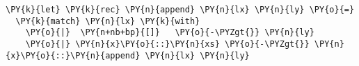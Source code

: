 \begin{Verbatim}[commandchars=\\\{\}]
\PY{k}{let} \PY{k}{rec} \PY{n}{append} \PY{n}{lx} \PY{n}{ly} \PY{o}{=}
  \PY{k}{match} \PY{n}{lx} \PY{k}{with}
    \PY{o}{|}  \PY{n+nb+bp}{[]}   \PY{o}{-\PYZgt{}} \PY{n}{ly}
    \PY{o}{|} \PY{n}{x}\PY{o}{::}\PY{n}{xs} \PY{o}{-\PYZgt{}} \PY{n}{x}\PY{o}{::}\PY{n}{append} \PY{n}{lx} \PY{n}{ly}
\end{Verbatim}
